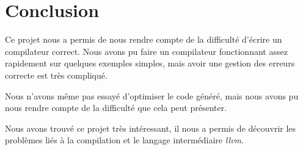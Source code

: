 \documentclass{scrartcl}
\newcommand{\llvm}{\textit{llvm}}
\begin{document}
\section{Conclusion}
  Ce projet nous a permis de nous rendre compte de la difficulté d'écrire un
  compilateur correct. Nous avons pu faire un compilateur fonctionnant assez
  rapidement sur quelques exemples simples, mais avoir une gestion des erreurs
  correcte est très compliqué.

  Nous n'avons même pas essayé d'optimiser le code généré, mais nous avons pu
  nous rendre compte de la difficulté que cela peut présenter.

  Nous avons trouvé ce projet très intéressant, il nous a permis de découvrir
  les problèmes liés à la compilation et le langage intermédiaire \llvm{}.
\end{document}
